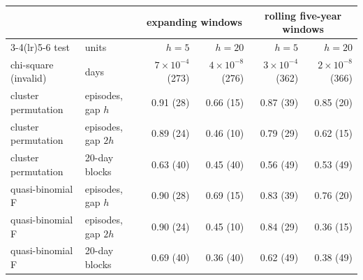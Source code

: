 \begin{tabular}{llrrrr}\toprule
 & & \multicolumn{2}{c}{expanding windows} & \multicolumn{2}{c}{rolling five-year windows}\\
\cmidrule(lr){3-4}\cmidrule(lr){5-6} test & units & $h=5$ & $h=20$ & $h=5$ & $h=20$\\\midrule
chi-square (invalid) & days & $7\times10^{-4}$ (273) & $4\times10^{-8}$ (276) & $3\times10^{-4}$ (362) & $2\times10^{-8}$ (366)\\
cluster permutation & episodes, gap $h$ & 0.91 (28) & 0.66 (15) & 0.87 (39) & 0.85 (20)\\
cluster permutation & episodes, gap $2h$ & 0.89 (24) & 0.46 (10) & 0.79 (29) & 0.62 (15)\\
cluster permutation & 20-day blocks & 0.63 (40) & 0.45 (40) & 0.56 (49) & 0.53 (49)\\
quasi-binomial F & episodes, gap $h$ & 0.90 (28) & 0.69 (15) & 0.83 (39) & 0.76 (20)\\
quasi-binomial F & episodes, gap $2h$ & 0.90 (24) & 0.45 (10) & 0.84 (29) & 0.36 (15)\\
quasi-binomial F & 20-day blocks & 0.69 (40) & 0.36 (40) & 0.62 (49) & 0.38 (49)\\
\bottomrule\end{tabular}
